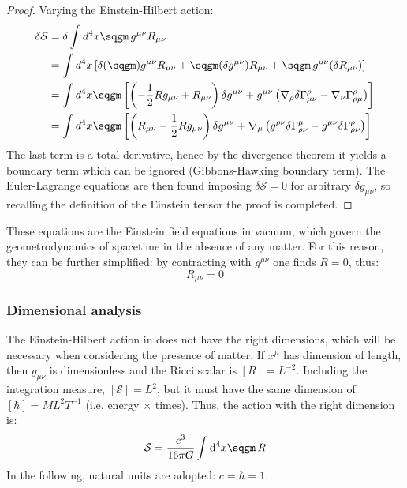 \begin{proofbox}
  \begin{proof}
    
    Varying the Einstein-Hilbert action:
    \begin{equation*}
      \begin{split}
        \delta \mathcal{S}
        &= \delta \int d^4 x \sqgm\, g^{\mu \nu} R_{\mu \nu} \\
        &= \int d^4 x \left[ \delta (\sqgm) g^{\mu \nu} R_{\mu \nu} + \sqgm (\delta g^{\mu \nu}) R_{\mu \nu} + \sqgm\, g^{\mu \nu} (\delta R_{\mu \nu}) \right] \\
        &= \int d^4 x \sqgm \left[ \left( - \frac{1}{2} R g_{\mu \nu} + R_{\mu \nu} \right) \delta g^{\mu \nu} + g^{\mu \nu} \left( \na_\rho \delta \Gamma^\rho_{\mu \nu} - \na_\nu \Gamma^\rho_{\rho \mu} \right) \right] \\
        &= \int d^4 x \sqgm \left[ \left( R_{\mu \nu} - \frac{1}{2} R g_{\mu \nu} \right) \delta g^{\mu \nu} + \na_\mu \left( g^{\rho \nu} \delta \Gamma^\mu_{\rho \nu} - g^{\mu \nu} \delta \Gamma^\rho_{\rho \nu} \right) \right]
      \end{split}
    \end{equation*}
    The last term is a total derivative, hence by the divergence theorem  it yields a boundary term which can be ignored (Gibbons-Hawking boundary term). The Euler-Lagrange equations are then found imposing $ \delta \mathcal{S} = 0 $ for arbitrary $ \delta g_{\mu \nu} $, so recalling the definition of the Einstein tensor  the proof is completed.
  \end{proof}
\end{proofbox}

These equations are the Einstein field equations in vacuum, which govern the geometrodynamics of spacetime in the absence of any matter. For this reason, they can be further simplified: by contracting with $ g^{\mu \nu} $ one finds $ R = 0 $, thus:
\begin{equation}
  R_{\mu \nu} = 0
\end{equation}

\subsubsection{Dimensional analysis}

The Einstein-Hilbert action in  does not have the right dimensions, which will be necessary when considering the presence of matter.
If $ x^\mu $ has dimension of length, then $ g_{\mu \nu} $ is dimensionless and the Ricci scalar is $ [R] = L^{-2} $. Including the integration measure, $ [\mathcal{S}] = L^2 $, but it must have the same dimension of $ [\hbar] =  M L^2 T^{-1} $ (i.e. energy $ \times $ times). Thus, the action with the right dimension is:
\begin{equation}
  \mathcal{S} = \frac{c^3}{16 \pi G} \int \dd^4 x \sqgm \, R
  \label{eq:einstein-hilbert}
\end{equation}
In the following, natural units are adopted: $ c = \hbar = 1 $.

